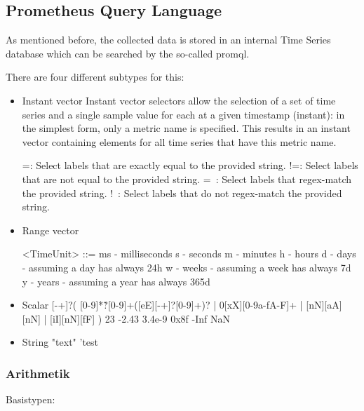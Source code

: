 \subsection{Prometheus Query Language}
As mentioned before, the collected data is stored in an internal Time Series database which can be searched by the so-called \gls{promql}.

There are four different subtypes for this:
\begin{itemize}
	\item Instant vector
	Instant vector selectors allow the selection of a set of time series and a single sample value for each at a given timestamp (instant): in the simplest form, only a metric name is specified. This results in an instant vector containing elements for all time series that have this metric name.
	
	
	=: Select labels that are exactly equal to the provided string.
	!=: Select labels that are not equal to the provided string.
	=~: Select labels that regex-match the provided string.
	!~: Select labels that do not regex-match the provided string.
	
	
	
	\item Range vector
	
	<TimeUnit> ::=
	ms - milliseconds
	s - seconds
	m - minutes
	h - hours
	d - days - assuming a day has always 24h
	w - weeks - assuming a week has always 7d
	y - years - assuming a year has always 365d
	
	
	\item Scalar
	[-+]?(
	[0-9]*\.?[0-9]+([eE][-+]?[0-9]+)?
	| 0[xX][0-9a-fA-F]+
	| [nN][aA][nN]
	| [iI][nN][fF]
	)
	23
	-2.43
	3.4e-9
	0x8f
	-Inf
	NaN
	\item String
	"text"
	'test
\end{itemize}

\subsubsection{Arithmetik}

Basistypen:

